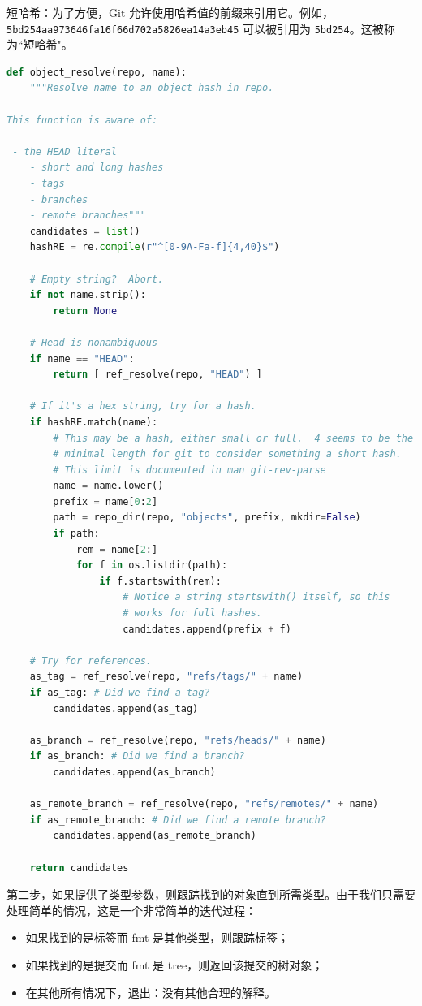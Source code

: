 \documentclass{ctexart}
\theoremstyle{remark}
\theoremstyle{warningstyle}
\theoremstyle{warningstyle}
\begin{document}
短哈希：为了方便，Git 允许使用哈希值的前缀来引用它。例如，\lstinline|5bd254aa973646fa16f66d702a5826ea14a3eb45| 可以被引用为 \lstinline|5bd254|。这被称为``短哈希"。
\begin{lstlisting}[language=Python]
def object_resolve(repo, name):
    """Resolve name to an object hash in repo.

This function is aware of:

 - the HEAD literal
    - short and long hashes
    - tags
    - branches
    - remote branches"""
    candidates = list()
    hashRE = re.compile(r"^[0-9A-Fa-f]{4,40}$")

    # Empty string?  Abort.
    if not name.strip():
        return None

    # Head is nonambiguous
    if name == "HEAD":
        return [ ref_resolve(repo, "HEAD") ]

    # If it's a hex string, try for a hash.
    if hashRE.match(name):
        # This may be a hash, either small or full.  4 seems to be the
        # minimal length for git to consider something a short hash.
        # This limit is documented in man git-rev-parse
        name = name.lower()
        prefix = name[0:2]
        path = repo_dir(repo, "objects", prefix, mkdir=False)
        if path:
            rem = name[2:]
            for f in os.listdir(path):
                if f.startswith(rem):
                    # Notice a string startswith() itself, so this
                    # works for full hashes.
                    candidates.append(prefix + f)

    # Try for references.
    as_tag = ref_resolve(repo, "refs/tags/" + name)
    if as_tag: # Did we find a tag?
        candidates.append(as_tag)

    as_branch = ref_resolve(repo, "refs/heads/" + name)
    if as_branch: # Did we find a branch?
        candidates.append(as_branch)

    as_remote_branch = ref_resolve(repo, "refs/remotes/" + name)
    if as_remote_branch: # Did we find a remote branch?
        candidates.append(as_remote_branch)

    return candidates
\end{lstlisting}
第二步，如果提供了类型参数，则跟踪找到的对象直到所需类型。由于我们只需要处理简单的情况，这是一个非常简单的迭代过程：
\begin{itemize}
    \item 如果找到的是标签而 fmt 是其他类型，则跟踪标签；
    \item 如果找到的是提交而 fmt 是 tree，则返回该提交的树对象；
    \item 在其他所有情况下，退出：没有其他合理的解释。
\end{itemize}
\end{document}
